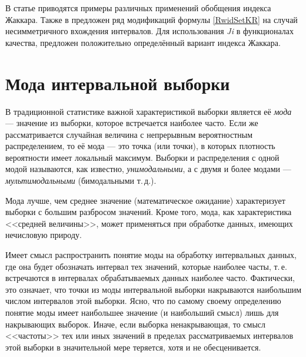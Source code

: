 \documentclass[a5paper,openany]{book}
\begin{document}
В статье \cite{Jaccard2022} приводятся примеры различных применений обобщения 
индекса Жаккара. Также в \cite{Jaccard2022} предложен ряд модификаций формулы 
\eqref{RwidSetKR} на случай несимметричного вхождения интервалов. Для использования 
\textsl{Ji} в функционалах качества, предложен положительно определённый вариант 
индекса Жаккара. 
  
  
\section{Мода интервальной выборки} 
\label{ModeSampleSect} 
  
  
В традиционной статистике важной характеристикой выборки является её \emph{мода} 
--- значение из выборки, которое встречается наиболее часто. Если же рассматривается 
случайная величина с непрерывным вероятностным распределением, то её мода --- это 
точка (или точки), в которых плотность вероятности имеет локальный максимум. Выборки 
и распределения с одной модой называются, как известно, \emph{унимодальными}, а 
с двумя и более модами --- \emph{мультимодальными} (бимодальными т.\,д.). 
  
  
Мода лучше, чем среднее значение (математическое ожидание) характеризует выборки 
с большим разбросом значений. Кроме того, мода, как характеристика <<средней 
величины>>,  может применяться при обработке данных, имеющих нечисловую природу. 
    
Имеет смысл  распространить понятие моды на обработку интервальных данных, где она  
будет обозначать интервал тех значений, которые наиболее часты, т.\,е. встречаются 
в интервалах обрабатываемых данных наиболее часто. Фактически, это означает, что 
точки из моды интервальной выборки накрываются наибольшим числом интервалов этой 
выборки. Ясно, что по самому своему определению понятие моды имеет наибольшее значение 
(и наибольший смысл) лишь для накрывающих выборок. Иначе, если выборка ненакрывающая, 
то смысл <<частоты>> тех или иных значений в пределах рассматриваемых интервалов этой 
выборки в значительной мере теряется, хотя и не обесценивается. 
  
   
\end{document}
